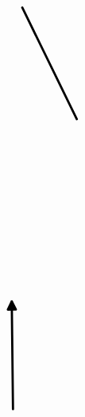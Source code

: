\documentclass[10pt]{article}
\theoremstyle{plain}
\theoremstyle{remark}
\begin{document}
\[\begin{pgfpicture}
\begin{pgfscope}
\pgfpathlineto{\pgfqpoint{1.098690in}{3.574661in}}%
\pgfpathlineto{\pgfqpoint{1.009514in}{3.619912in}}%
\pgfpathclose%
\pgfusepath{stroke,fill}%
\end{pgfscope}%
\begin{pgfscope}%
\pgfpathrectangle{\pgfqpoint{0.224216in}{0.187957in}}{\pgfqpoint{3.754528in}{5.640000in}} %
\pgfusepath{clip}%
\pgfsetroundcap%
\pgfsetroundjoin%
\pgfsetlinewidth{2.007500pt}%
\definecolor{currentstroke}{rgb}{0.000000,0.000000,0.000000}%
\pgfsetstrokecolor{currentstroke}%
\pgfsetdash{}{0pt}%
\pgfpathmoveto{\pgfqpoint{2.117767in}{0.518050in}}%
\pgfpathquadraticcurveto{\pgfqpoint{2.109987in}{1.200262in}}{\pgfqpoint{2.102561in}{1.851420in}}%
\pgfusepath{stroke}%
\end{pgfscope}%
\begin{pgfscope}%
\pgfpathrectangle{\pgfqpoint{0.224216in}{0.187957in}}{\pgfqpoint{3.754528in}{5.640000in}} %
\pgfusepath{clip}%
\pgfsetroundcap%
\pgfsetroundjoin%
\definecolor{currentfill}{rgb}{0.000000,0.000000,0.000000}%
\pgfsetfillcolor{currentfill}%
\pgfsetlinewidth{2.007500pt}%
\definecolor{currentstroke}{rgb}{0.000000,0.000000,0.000000}%
\pgfsetstrokecolor{currentstroke}%
\pgfsetdash{}{0pt}%
\pgfpathmoveto{\pgfqpoint{2.053705in}{1.750857in}}%
\pgfpathlineto{\pgfqpoint{2.102561in}{1.851420in}}%
\pgfpathlineto{\pgfqpoint{2.153698in}{1.751997in}}%
\pgfpathlineto{\pgfqpoint{2.053705in}{1.750857in}}%
\pgfpathclose%
\pgfusepath{stroke,fill}%
\end{pgfscope}%
\begin{pgfscope}%
\pgfpathrectangle{\pgfqpoint{0.224216in}{0.187957in}}{\pgfqpoint{3.754528in}{5.640000in}} %
\pgfusepath{clip}%
\pgfsetroundcap%
\pgfsetroundjoin%
\pgfsetlinewidth{2.007500pt}%
\definecolor{currentstroke}{rgb}{0.000000,0.000000,0.000000}%
\pgfsetstrokecolor{currentstroke}%
\pgfsetdash{}{0pt}%
\pgfpathmoveto{\pgfqpoint{2.910859in}{4.110761in}}%
\pgfpathquadraticcurveto{\pgfqpoint{2.565099in}{4.815625in}}{\pgfqpoint{2.233017in}{5.492608in}}%
\pgfusepath{stroke}%
\end{pgfscope}%
\begin{pgfscope}%
\pgfpathrectangle{\pgfqpoint{0.224216in}{0.187957in}}{\pgfqpoint{3.754528in}{5.640000in}} %
\pgfusepath{clip}%
\pgfsetroundcap%
\pgfsetroundjoin%
\definecolor{currentfill}{rgb}{0.000000,0.000000,0.000000}%
\pgfsetfillcolor{currentfill}%
\pgfsetlinewidth{2.007500pt}%
\definecolor{currentstroke}{rgb}{0.000000,0.000000,0.000000}%
\pgfsetstrokecolor{currentstroke}%
\pgfsetdash{}{0pt}%
\pgfpathmoveto{\pgfqpoint{2.232167in}{5.380807in}}%
\pgfpathlineto{\pgfqpoint{2.233017in}{5.492608in}}%

\end{pgfscope}
\end{pgfpicture}\]
\end{document}

